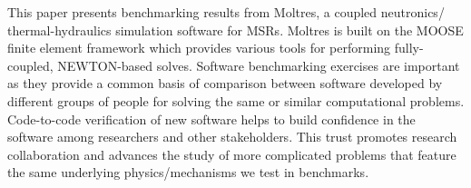 This paper presents benchmarking results from Moltres, a coupled
neutronics/ thermal-hydraulics simulation software for \glspl{MSR}. Moltres is
built on the \gls{MOOSE} \cite{gaston_physics-based_2015} finite element
framework which provides various tools for performing fully-coupled,
NEWTON-based solves. Software benchmarking exercises are important as they
provide a common basis of comparison between software developed by different
groups of people for solving the same or similar computational problems.
Code-to-code verification of new software helps to build confidence in the
software among researchers and other stakeholders. This trust promotes
research collaboration and advances the study of more complicated problems that
feature the same underlying physics/mechanisms we test in benchmarks.
